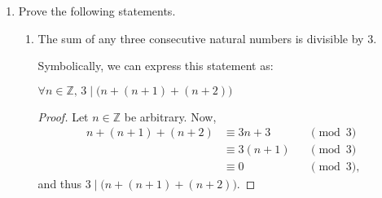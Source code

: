 \documentclass[11pt]{article}
\def\integers{\mathbb{Z}}
\begin{document}
\begin{enumerate}
\begin{enumerate}
\begin{Solution}
\begin{itemize}
\begin{itemize}
  \item If $k=m+1$, then $\binom{m+1}{k} = \binom{m+1}{m+1}=1$, which is an integer.
  \item If $k>m+1$, then $\binom{m+1}{k}=0$ by definition, which is an integer. 
 \end{itemize}
 In each case, we see that $\binom{m+1}{k}$ is an integer. Hence $P(m+1)$ is true.
 \end{itemize}
By the principle of induction, it holds that $\binom{n}{k}$ is an integer for all non-negative integers $n,k\in\integers$.
\end{Solution}

\item\label{binompart} Let $p$ be a prime number. It holds that 
\[
 \binom{p}{k}\equiv 0 \pmod{p}
\]
for all $k\in\{1,2,\dots,p-1\}$.
\begin{Solution}
 \begin{proof}
  Let $k\in\{1,2,\dots,p-1\}$. By definition, we have that
  \[
   \binom{p}{k} = \frac{p!}{k!(p-k)!},
  \]
and thus
\begin{align*}
 p\cdot(p-1)! = p! &= k!(p-k)!\binom{p}{k}\\
 &=(1\cdot 2\cdot\cdots \cdot k)(1\cdot 2\cdot\cdots\cdot (p-k))\binom{p}{k},
\end{align*}
and thus $p\mid\left(k!(p-k)!\binom{p}{k}\right)$.
Note also that 
\[
 \gcd(p,1) = \gcd(p,2)=\cdots =\gcd(p,p-1)=1.
\]
Because $1\leq k\leq p-1$ and $1\leq p-k\leq p-1$, it follows that
\[
 \gcd\bigl(p,k!(p-k)!\bigr) = 1.
\]
Because $p\mid\left(k!(p-k)!\binom{p}{k}\right)$ and $\gcd\bigl(p,k!(p-k)!\bigr) = 1$, it follows from Euclid's Lemma that 
\[
 p\mid \binom{p}{k}.
\]
This implies that $\binom{p}{k}\equiv 0\pmod{p}$.
 \end{proof}

\end{Solution}

\end{enumerate}

\item Prove the following statements.
\begin{enumerate}
\item The sum of any three consecutive natural numbers is divisible by 3.
\begin{Solution}
 Symbolically, we can express this statement as:
 \begin{center}
  $\forall n\in\integers, \, 3\mid \big(n+(n+1)+(n+2)\big)$
 \end{center}
\begin{proof}
 Let $n\in\integers$ be arbitrary. Now,
 \begin{align*}
  n+(n+1)+(n+2) 
  & \equiv 3n + 3&&\pmod{3}\\
  & \equiv 3(n+1)&&\pmod{3}\\
  & \equiv 0&&\pmod{3},
 \end{align*}
and thus $3\mid \big(n+(n+1)+(n+2)\big)$. 
\end{proof}


\end{Solution}
\end{enumerate}
\end{enumerate}
\end{document}
